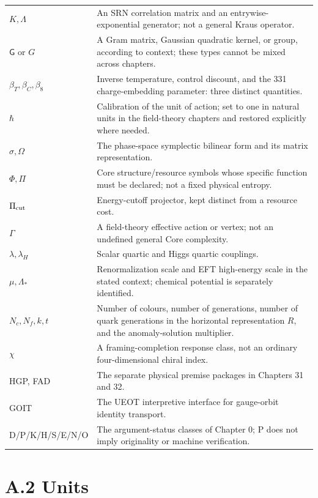 \documentclass[
  11pt,
  oneside]{book}
\begin{document}
\begin{longtable}[]{@{}
  >{\raggedright\arraybackslash}p{}
  >{\raggedright\arraybackslash}p{}@{}}
\(K,\Lambda\) & An SRN correlation matrix and an entrywise-exponential
generator; not a general Kraus operator. \\
\(\mathsf G\) or \(G\) & A Gram matrix, Gaussian quadratic kernel, or
group, according to context; these types cannot be mixed across
chapters. \\
\(\beta_T,\beta_C,\beta_8\) & Inverse temperature, control discount, and
the 331 charge-embedding parameter: three distinct quantities. \\
\(\hbar\) & Calibration of the unit of action; set to one in natural
units in the field-theory chapters and restored explicitly where
needed. \\
\(\sigma,\Omega\) & The phase-space symplectic bilinear form and its
matrix representation. \\
\(\Phi,\Pi\) & Core structure/resource symbols whose specific function
must be declared; not a fixed physical entropy. \\
\(\Pi_{\rm cut}\) & Energy-cutoff projector, kept distinct from a
resource cost. \\
\(\Gamma\) & A field-theory effective action or vertex; not an undefined
general Core complexity. \\
\(\lambda,\lambda_H\) & Scalar quartic and Higgs quartic couplings. \\
\(\mu,\Lambda_*\) & Renormalization scale and EFT high-energy scale in
the stated context; chemical potential is separately identified. \\
\(N_c,N_f,k,t\) & Number of colours, number of generations, number of
quark generations in the horizontal representation \(R\), and the
anomaly-solution multiplier. \\
\(\chi\) & A framing-completion response class, not an ordinary
four-dimensional chiral index. \\
HGP, FAD & The separate physical premise packages in Chapters 31 and
32. \\
GOIT & The UEOT interpretive interface for gauge-orbit identity
transport. \\
D/P/K/H/S/E/N/O & The argument-status classes of Chapter 0; P does not
imply originality or machine verification. \\
\end{longtable}

\section{A.2 Units}
\end{document}
